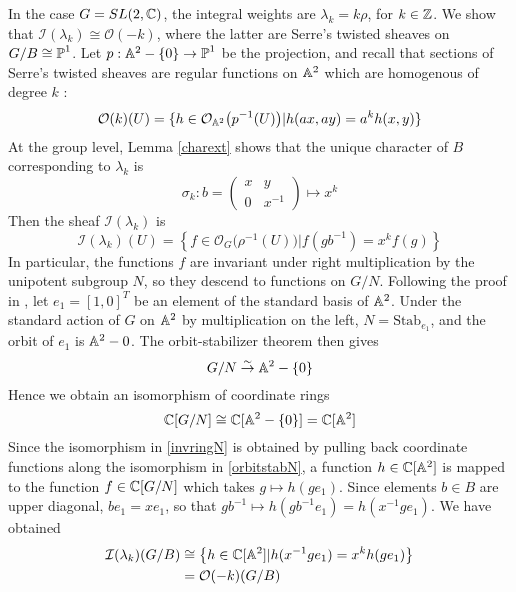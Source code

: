 \begin{example}
In the case $G = SL(2,\mathbb{C})$, the integral weights are $\lambda_k = k \rho$, for $k \in \mathbb{Z}$. We show that $\mathcal{I}(\lambda_k) 
\cong \mathcal{O}(-k)$, where the latter are Serre's
twisted sheaves on $G/B \cong \operatorname{\mathbb{P}}^1$. Let $p: \mathbb{A}^2 - \{0\} \to \operatorname{\mathbb{P}}^1$ be the projection, and recall that sections 
of Serre's twisted sheaves are regular functions on $\mathbb{A}^2$ which are homogenous of degree $k$ :
\[	\mathcal{O}(k)(U) = \{ h \in \mathcal{O}_{\mathbb{A}^2}\big(p^{-1}(U)\big) | h(ax, ay) = a^k h(x,y) \}	\]
At the group level, Lemma \ref{charext} shows that the unique character of $B$ corresponding 
to $\lambda_k$ is
\[	\sigma_k : b = \left( \begin{array} {cc} x & y \\ 0 & x^{-1} \end{array} \right) \mapsto x^k \]
Then the sheaf $\mathcal{I}(\lambda_k)$ is
\[	\mathcal{I}(\lambda_k)(U) = \left\{ f \in \mathcal{O}_G\big(\rho^{-1}(U)\big) | f(gb^{-1}) = x^k f(g) \right\}	\]
In particular, the functions $f$ are invariant under right multiplication by the unipotent subgroup $N$, so they descend
to functions on $G/N$. Following the proof
in , let $e_1 = [1, 0]^T$ be an element of the standard basis of $\mathbb{A}^2$. Under the standard
action of $G$ on $\mathbb{A}^2$ by multiplication on the left, $N = \text{Stab}_{e_1}$, and the orbit of $e_1$ is $\mathbb{A}^2 - 0$. The
orbit-stabilizer theorem then gives
\begin{equation}
\label{orbitstabN}
G/N \overset{\sim}{\to} \mathbb{A}^2 - \{0\}
\end{equation}
Hence we obtain an isomorphism of coordinate rings
\begin{equation}
\label{invringN}
\mathbb{C}[G/N] \cong \mathbb{C}[\mathbb{A}^2 - \{0\}] = \mathbb{C}[\mathbb{A}^2]
\end{equation}
Since the isomorphism in \ref{invringN} is obtained by pulling back coordinate functions along the isomorphism in
\ref{orbitstabN}, a function $h \in \mathbb{C}[\mathbb{A}^2]$ is mapped to the function $f \in \mathbb{C}[G/N]$ which takes 
$g \mapsto h(ge_1)$. Since
elements $b \in B$ are upper diagonal, $b e_1 = x e_1$, so that $gb^{-1} \mapsto h(gb^{-1}e_1) = h(x^{-1} ge_1)$.
We have obtained
\begin{align*}
\mathcal{I}(\lambda_k)(G/B) &\cong \left\{ h \in \mathbb{C}[\mathbb{A}^2] | h(x^{-1}g e_1) = x^k h(g e_1) \right\} \\
&= \mathcal{O}(-k)(G/B)
\end{align*}
\end{example}










